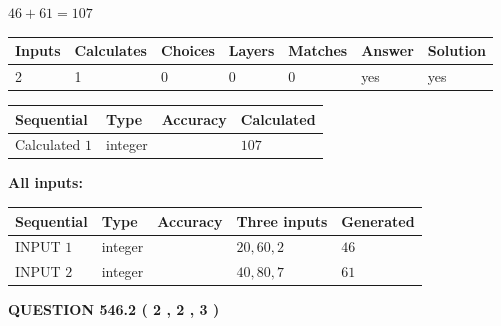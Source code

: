 \documentclass[12pt]{article}
\begin{document}
 

$ %
46 +  %
61=   %
107$
 
 
\noindent{}
 
 

 
   
   
   
   
\noindent\begin{tabular}{|l|l|l|l|l|l|l|}
 \hline
Inputs & Calculates & Choices & Layers & Matches & Answer & Solution \\ \hline
 2  & 
 1  & 
 0
  & 
 0  & 
 0  & 
  yes & 
  yes 
  \\ \hline
 \end{tabular}
   
   
   
   
\noindent{}
   
   
  
  
\noindent\begin{tabular}{|l|l|l|l|}
\hline
 Sequential & Type & Accuracy & Calculated \\ 
\hline
 
 
  Calculated $  1 $ & integer &  & 
  $ 107 $ 
 \\  \hline  
 \end{tabular}
   
   
   
   
\noindent\vspace{0.1in}\hspace{-0.08in} {\textbf{\Large{All inputs: }}}
   
   
  
  
\noindent\begin{tabular}{|l|l|l|l|l|}
\hline
 Sequential & Type & Accuracy & Three inputs & Generated \\ 
\hline
 
 
  INPUT $  1 $ & integer &  & $
 20
 , 
 60
 , 
 2
 $ & $ 46 $ 
 \\  \hline  
 
 
  INPUT $  2 $ & integer &  & $
 40
 , 
 80
 , 
 7
 $ & $ 61 $ 
 \\  \hline  
 \end{tabular}
   
   
  
\vspace{0.2in}
  
{\textbf{\Large{QUESTION
546.2 
 ( 2 , 2 , 3 )
}}}
  
\end{document}
